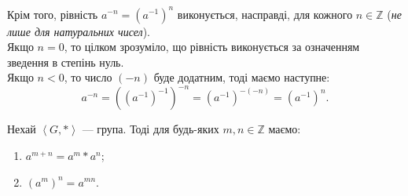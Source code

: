 \documentclass{math_library}
\begin{document}
\begin{remark}
Крім того, рівність $a^{-n} = (a^{-1})^n$ виконується, насправді, для кожного $n \in \mathbb{Z}$ (\textit{не лише для натуральних чисел}).\\
Якщо $n = 0$, то цілком зрозуміло, що рівність виконується за означенням зведення в степінь нуль.\\
Якщо $n < 0$, то число $(-n)$ буде додатним, тоді маємо наступне:
\[
a^{-n} = ((a^{-1})^{-1})^{-n} = (a^{-1})^{-(-n)} = (a^{-1})^n.
\]
\end{remark}

\begin{proposition}
Нехай $\left<G, *\right>$ --- група. Тоді для будь-яких $m,n \in \mathbb{Z}$ маємо:
\begin{enumerate}[nosep, wide=0pt, label={\arabic*)}]

\item $a^{m+n} = a^m*a^n$;
\item $(a^m)^n = a^{mn}$.
\end{enumerate}
\end{proposition}
\end{document}
